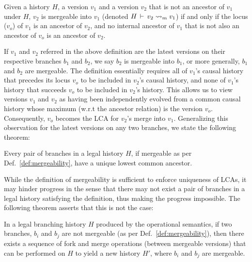 \begin{definition} 
\label{def:mergeability}
Given a history $H$, a version $v_1$ and a version $v_2$ that is not
an ancestor of $v_1$ under $H$, $v_2$ is mergeable into $v_1$ (denoted
$H\,\vdash\,v_2 \rightsquigarrow_m v_1$) if and only if the locus ($v_o$) of
$v_1$ is an ancestor of $v_2$, and no internal ancestor of $v_1$ that
is not also an ancestor of $v_o$ is an ancestor of $v_2$.
\end{definition}

If $v_1$ and $v_2$ referred in the above definition are the latest
versions on their respective branches $b_1$ and $b_2$, we say $b_2$ is
mergeable into $b_1$, or more generally, $b_1$ and $b_2$ are
mergeable. The definition essentially requires all of $v_1$'s causal
history that precedes its locus $v_o$ to be included in $v_2$'s causal
history, and none of $v_1$'s history that succeeds $v_o$ to be
included in $v_2$'s history. This allows us to view versions $v_1$ and
$v_2$ as having been independently evolved from a common causal
history whose maximum (w.r.t the ancestor relation) is the version
$v_o$. Consequently, $v_o$ becomes the LCA for $v_2$'s merge into
$v_1$. Generalizing this observation for the latest versions on
any two branches, we state the following theorem:

\begin{theorem} 
Every pair of branches in a legal history $H$, if mergeable as per
Def.~\ref{def:mergeability}, have a unique lowest common ancestor.
\end{theorem}

While the definition of mergeability is sufficient to enforce
uniqueness of LCAs, it may hinder progress in the sense that there may
not exist a pair of branches in a legal history satisfying the
definition, thus making the progress impossible. The following theorem
asserts that this is not the case:

\begin{theorem} 
In a legal branching history $H$ produced by the operational
semantics, if two branches, $b_i$ and $b_j$ are not mergeable (as per
Def.~\ref{def:mergeability}), then there exists a sequence of fork and
merge operations (between mergeable versions) that can be performed on
$H$ to yield a new history $H'$, where $b_i$ and $b_j$ are mergeable.
\end{theorem}

